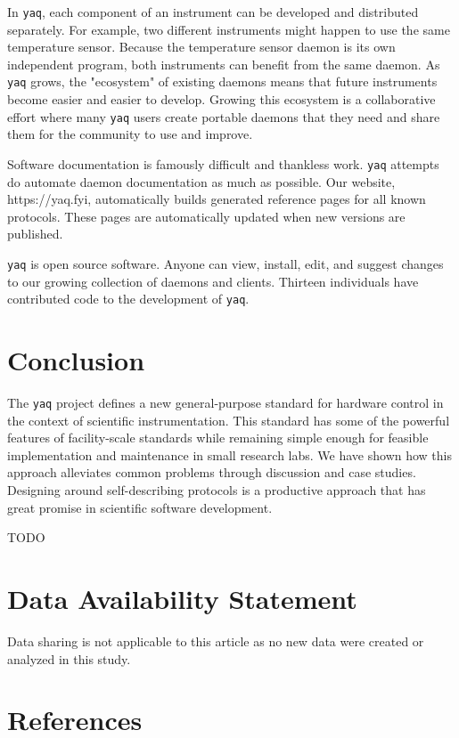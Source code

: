 \documentclass[aip, amsmath, amssymb, reprint,]{revtex4-1}
\newcommand\yaq{\texttt{yaq}}
\begin{document}
In \yaq{}, each component of an instrument can be developed and distributed separately.
For example, two different instruments might happen to use the same temperature sensor.
Because the temperature sensor daemon is its own independent program, both instruments can benefit from the same daemon.
As \yaq{} grows, the "ecosystem" of existing daemons means that future instruments become easier and easier to develop.
Growing this ecosystem is a collaborative effort where many \yaq{} users create portable daemons that they need and share them for the community to use and improve.

Software documentation is famously difficult and thankless work.
\yaq{} attempts do automate daemon documentation as much as possible.
Our website, https://yaq.fyi, automatically builds generated reference pages for all known protocols.
These pages are automatically updated when new versions are published.

\yaq{} is open source software.
Anyone can view, install, edit, and suggest changes to our growing collection of daemons and clients.
Thirteen individuals have contributed code to the development of \yaq{}.


\section{Conclusion}

The \yaq{} project defines a new general-purpose standard for hardware control in the context of scientific instrumentation.
This standard has some of the powerful features of facility-scale standards while remaining simple enough for feasible implementation and maintenance in small research labs.
We have shown how this approach alleviates common problems through discussion and case studies.
Designing around self-describing protocols is a productive approach that has great promise in scientific software development.

\begin{acknowledgments}
  TODO
\end{acknowledgments}

\section*{Data Availability Statement}

Data sharing is not applicable to this article as no new data were created or analyzed in this study.

\section*{References}

\nocite{*}

\end{document}

